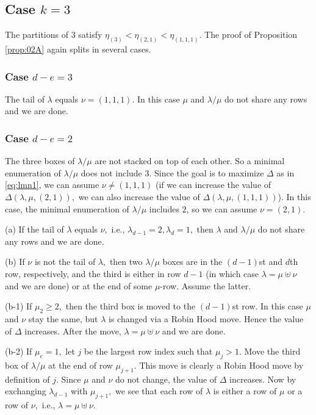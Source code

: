 \documentclass[12pt,dvipsnames,accepted=2016-08-18,a4paper,onecolumn]{quantumarticle}
\def\la{\lambda}
\def\la{\lambda}
\numberwithin{equation}{section}
\theoremstyle{definition}
\begin{document}
\subsection{Case $k=3$}

The partitions of 3 satisfy $\eta_{(3)} < \eta_{(2,1)} < \eta_{(1,1,1)}$. The proof of Proposition \ref{prop:02A} again splits in several cases.

\subsubsection{Case $d-e=3$}
The tail of $\la$ equals $\nu = (1,1,1).$ In this case $\mu$ and $\la / \mu$ do not share any rows and we are done.

\subsubsection{Case $d-e=2$}
The three boxes of $\la / \mu$ are not stacked on top of each other. So a minimal enumeration of $\la / \mu$ does not include $3$.
Since the goal is to maximize $\Delta$ as in \eqref{eq:lmn1}, we can assume $\nu \neq (1,1,1)$ (if we can increase the value of $\Delta(\la,\mu,(2,1)),$ we can also increase the value of $\Delta(\la,\mu,(1,1,1))$).
In this case, the minimal enumeration of $\la / \mu$ includes $2$, so we can assume $\nu = (2,1).$

(a) If the tail of $\la$ equals $\nu,$ i.e., $\lambda_{d-1} = 2, \lambda_d=1,$ then $\la$ and $\la / \mu$ do not share any rows and we are done.

(b) If $\nu$ is not the tail of $\la,$ then two $\la / \mu$ boxes are in the $(d-1)$st and $d$th row, respectively, and the third is either in row $d-1$ (in which case $\lambda=\mu\uplus\nu$ and we are done) or at the end of some $\mu$-row. Assume the latter.

(b-1) If $\mu_2\geq 2,$ then the third box is moved to the $(d-1)$st row. In this case $\mu$ and $\nu$ stay the same, but $\la$ is changed via a Robin Hood move. Hence the value of $\Delta$ increases. After the move, $\lambda=\mu\uplus\nu$ and we are done.

(b-2) If $\mu_e=1,$  let $j$ be the largest row index such that $\mu_j>1.$ Move the third box of $\la/\mu$ at the end of row $\mu_{j+1}.$ This move is clearly a Robin Hood move by definition of $j.$ Since $\mu$ and $\nu$ do not change, the value of $\Delta$ increases. Now by exchanging $\la_{d-1}$ with $\mu_{j+1},$ we see that each row of $\la$ is either a row of $\mu$ or a row of $\nu,$ i.e., $\lambda=\mu\uplus\nu.$ 
\end{document}
